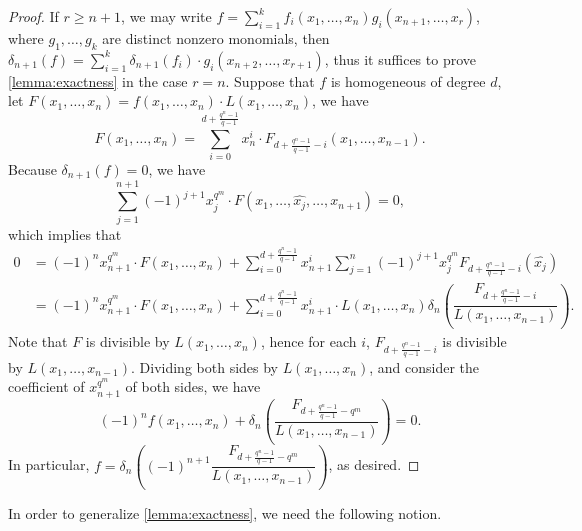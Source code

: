 \documentclass[12pt,a4paper]{report}
\theoremstyle{definition}
\theoremstyle{remark}
\theoremstyle{definition}
\begin{document}
\begin{proof}
    If $r\geq n+1$, we may write $f = \sum\limits_{i=1}^{k} f_i(x_1, \ldots, x_n) g_i(x_{n+1}, \ldots, x_r)$, where $g_1, \ldots, g_k$ are distinct nonzero monomials, then $\delta_{n+1}(f) = \sum\limits_{i=1}^{k}\delta_{n+1}(f_i)\cdot g_i(x_{n+2}, \ldots, x_{r+1})$, thus it suffices to prove \cref{lemma:exactness} in the case $r=n$. Suppose that $f$ is homogeneous of degree $d$, let $F(x_1, \ldots, x_n) = f(x_1, \ldots, x_n)\cdot L(x_1, \ldots, x_n)$, we have
    \begin{equation*}
        F(x_1, \ldots, x_n) = \sum\limits_{i=0}^{d+\frac{q^n-1}{q-1}}x_n^{i}\cdot F_{d+\frac{q^n-1}{q-1}-i}(x_1, \ldots, x_{n-1}).
    \end{equation*}
    Because $\delta_{n+1}(f) = 0$, we have
    \begin{equation*}
        \sum\limits_{j=1}^{n+1}(-1)^{j+1}x_j^{q^m}\cdot F(x_1, \ldots, \widehat{x_j}, \ldots, x_{n+1}) = 0,
    \end{equation*}
    which implies that
    \begin{align*}
        0&=(-1)^{n}x_{n+1}^{q^m}\cdot F(x_1, \ldots, x_n) + \sum\limits_{i=0}^{d+\frac{q^n-1}{q-1}}x_{n+1}^i\sum\limits_{j=1}^{n}(-1)^{j+1}x_j^{q^m}F_{d+\frac{q^n-1}{q-1}-i}(\widehat{x_j})\\
        &=(-1)^{n}x_{n+1}^{q^m}\cdot F(x_1, \ldots, x_n) + \sum\limits_{i=0}^{d+\frac{q^n-1}{q-1}}x_{n+1}^i\cdot L(x_1, \ldots, x_n) \delta_n\left(\dfrac{F_{d+\frac{q^n-1}{q-1}-i}}{L(x_1, \ldots, x_{n-1})}\right).
    \end{align*}
    Note that $F$ is divisible by $L(x_1, \ldots, x_n)$, hence for each $i$, $F_{d+\frac{q^n-1}{q-1}-i}$ is divisible by $L(x_1, \ldots, x_{n-1})$. Dividing both sides by $L(x_1, \ldots, x_n)$, and consider the coefficient of $x_{n+1}^{q^m}$ of both sides, we have
    \begin{equation*}
        (-1)^{n}f(x_1, \ldots, x_n) + \delta_n\left(\dfrac{F_{d+\frac{q^n-1}{q-1}-q^m}}{L(x_1, \ldots, x_{n-1})}\right) = 0.
    \end{equation*}
    In particular, $f = \delta_n\left((-1)^{n+1}\dfrac{F_{d+\frac{q^n-1}{q-1}-q^m}}{L(x_1, \ldots, x_{n-1})}\right)$, as desired.
\end{proof}
In order to generalize \cref{lemma:exactness}, we need the following notion.
\end{document}
